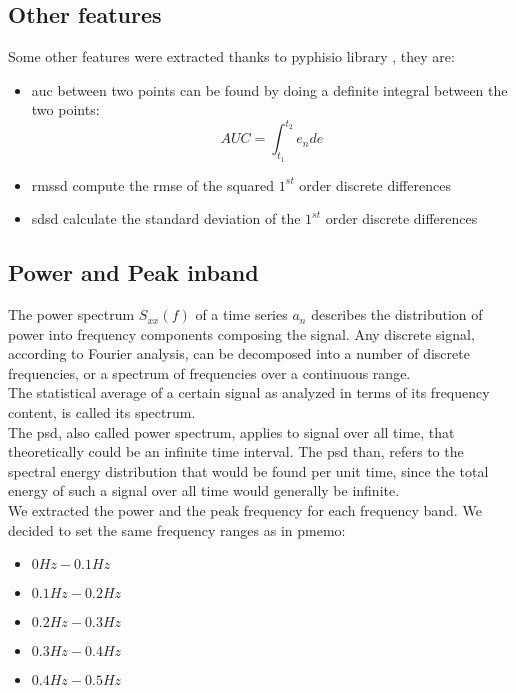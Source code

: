 \subsection{Other features}
Some other features were extracted thanks to pyphisio library \cite{bizzego2019pyphysio}, they are:
\begin{itemize}
	\item \gls{auc} between two points can be found by doing a definite integral between the two points:
	\begin{equation}
		AUC=\int_{t_1}^{t_2} e_n de
	\end{equation}
	\item \gls{rmssd} compute the \gls{rmse} of the squared $1^{st}$ order discrete differences
	\item \gls{sdsd} calculate the standard deviation of the $1^{st}$ order discrete differences
\end{itemize}

\subsection{Power and Peak inband}
The power spectrum $S_{xx}(f)$ of a time series $a_n$ describes the distribution of power into frequency components composing the signal. Any discrete signal, according to Fourier analysis, can be decomposed into a number of discrete frequencies, or a spectrum of frequencies over a continuous range.
\\
The statistical average of a certain signal as analyzed in terms of its frequency content, is called its spectrum.
\\ \indent
The \gls{psd}, also called power spectrum, applies to signal over all time, that theoretically could be an infinite time interval. The \gls{psd} than, refers to the spectral energy distribution that would be found per unit time, since the total energy of such a signal over all time would generally be infinite.
\\
We extracted the power and the peak frequency for each frequency band. We decided to set the same frequency ranges as in \gls{pmemo}:
\begin{itemize}
	\item $0Hz-0.1Hz$
	\item $0.1Hz-0.2Hz$
	\item $0.2Hz-0.3Hz$
	\item $0.3Hz-0.4Hz$
	\item $0.4Hz-0.5Hz$
\end{itemize}

